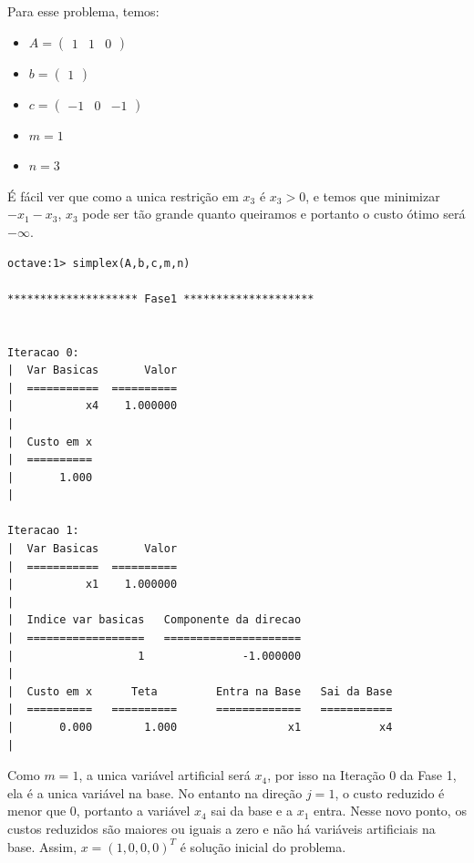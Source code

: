 \documentclass[12pt]{article}
\begin{document}
        Para esse problema, temos: 
	   
	\begin{itemize}
	\item $A = \begin{pmatrix}
    1 & 1 & 0 
    \end{pmatrix}$
    
	\item $b = \begin{pmatrix}
    1 
    \end{pmatrix} $
    
    \item $c = \begin{pmatrix}
    -1 & 0 & -1 
    \end{pmatrix}$
    
    \item $m = 1$
    
    \item $n = 3$
	\end{itemize}

	\lstset {firstnumber=1}	
	
	É fácil ver que como a unica restrição em $x_3$ é $x_3 > 0$, e temos que minimizar $-x_1 - x_3$, $x_3$ pode ser tão grande quanto queiramos e portanto o custo ótimo será $-\infty$.
	\begin{lstlisting}[style=term]
octave:1> simplex(A,b,c,m,n)

******************** Fase1 ********************


Iteracao 0:
|  Var Basicas       Valor
|  ===========  ==========
|           x4    1.000000
|  
|  Custo em x
|  ==========
|       1.000
|  

Iteracao 1:
|  Var Basicas       Valor
|  ===========  ==========
|           x1    1.000000
|  
|  Indice var basicas   Componente da direcao
|  ==================   =====================
|                   1               -1.000000
|  
|  Custo em x      Teta         Entra na Base   Sai da Base
|  ==========   ==========      =============   ===========
|       0.000        1.000                 x1            x4
|  

	\end{lstlisting}
	Como $m = 1$, a unica variável artificial será $x_4$, por isso na Iteração 0 da Fase 1, ela é a unica variável na base. No entanto na direção $j = 1$, o custo reduzido é menor que 0, portanto a variável $x_4$ sai da base e a $x_1$ entra. Nesse novo ponto, os custos reduzidos são maiores ou iguais a zero e não há variáveis artificiais na base. Assim, $x = (1, 0, 0, 0)^T$ é solução inicial do problema.
	
\end{document}
